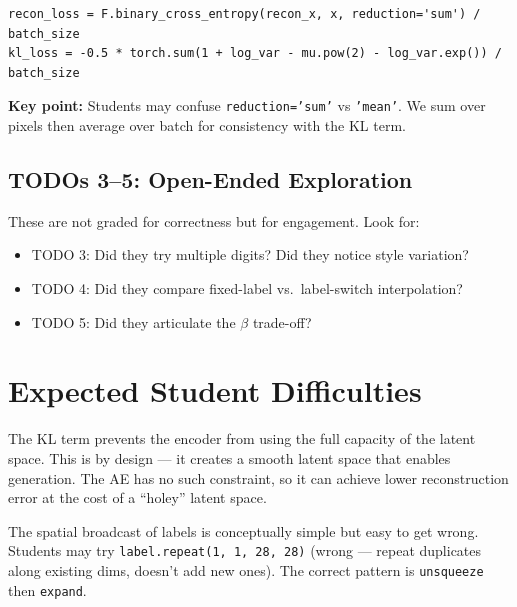 \documentclass[11pt,a4paper]{article}
\begin{document}
\begin{correctbox}
\begin{verbatim}
recon_loss = F.binary_cross_entropy(recon_x, x, reduction='sum') / batch_size
kl_loss = -0.5 * torch.sum(1 + log_var - mu.pow(2) - log_var.exp()) / batch_size
\end{verbatim}
\textbf{Key point:} Students may confuse \texttt{reduction='sum'} vs \texttt{'mean'}. We sum over pixels then average over batch for consistency with the KL term.
\end{correctbox}

\subsection{TODOs 3--5: Open-Ended Exploration}

These are not graded for correctness but for engagement. Look for:
\begin{itemize}
    \item TODO 3: Did they try multiple digits? Did they notice style variation?
    \item TODO 4: Did they compare fixed-label vs.\ label-switch interpolation?
    \item TODO 5: Did they articulate the $\beta$ trade-off?
\end{itemize}

\section{Expected Student Difficulties}

\begin{errorbox}
The KL term prevents the encoder from using the full capacity of the latent space. This is by design --- it creates a smooth latent space that enables generation. The AE has no such constraint, so it can achieve lower reconstruction error at the cost of a ``holey'' latent space.
\end{errorbox}

\begin{errorbox}
The spatial broadcast of labels is conceptually simple but easy to get wrong. Students may try \texttt{label.repeat(1, 1, 28, 28)} (wrong --- repeat duplicates along existing dims, doesn't add new ones). The correct pattern is \texttt{unsqueeze} then \texttt{expand}.
\end{errorbox}
\end{document}
